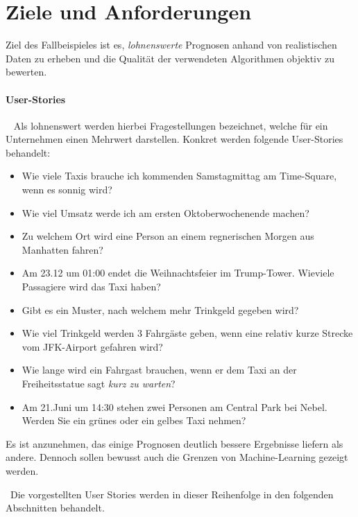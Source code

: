 \section{Ziele und Anforderungen}
\label{sec:Fallbeispiel} \label{sec:TaxiAllgemein} \label{sec:Allgemein}
Ziel des Fallbeispieles ist es, \textit{lohnenswerte} Prognosen anhand von realistischen Daten zu erheben und die Qualität der verwendeten Algorithmen objektiv zu bewerten. 

\paragraph{User-Stories} ~\newline
Als lohnenswert werden hierbei Fragestellungen bezeichnet, welche für ein Unternehmen einen Mehrwert darstellen. Konkret werden folgende User-Stories behandelt: ~\newline

\begin{itemize}
	\item Wie viele Taxis brauche ich kommenden Samstagmittag am Time-Square, wenn es sonnig wird?
	\item Wie viel Umsatz werde ich am ersten Oktoberwochenende machen?
	\item Zu welchem Ort wird eine Person an einem regnerischen Morgen aus Manhatten fahren?
	\item Am 23.12 um 01:00 endet die Weihnachtsfeier im Trump-Tower. Wieviele Passagiere wird das Taxi haben?
	\item Gibt es ein Muster, nach welchem mehr Trinkgeld gegeben wird?
	\item Wie viel Trinkgeld werden 3 Fahrgäste geben, wenn eine relativ kurze Strecke vom JFK-Airport gefahren wird?
	\item Wie lange wird ein Fahrgast brauchen, wenn er dem Taxi an der Freiheitsstatue sagt \textit{kurz zu warten}?
	\item Am 21.Juni um 14:30 stehen zwei Personen am Central Park bei Nebel. Werden Sie ein grünes oder ein gelbes Taxi nehmen? 
\end{itemize}

Es ist anzunehmen, das einige Prognosen deutlich bessere Ergebnisse liefern als andere. Dennoch sollen bewusst auch die Grenzen von Machine-Learning gezeigt werden.

~\newline Die vorgestellten User Stories werden in dieser Reihenfolge in den folgenden Abschnitten behandelt.

